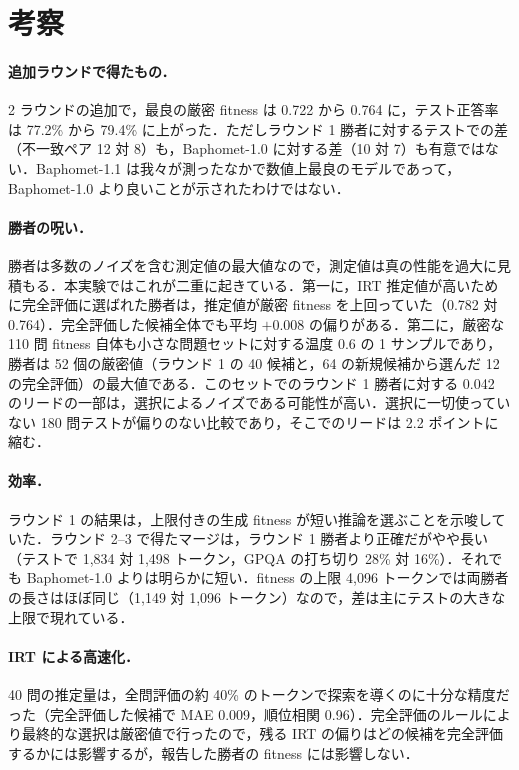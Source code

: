 \section{考察}
\paragraph{追加ラウンドで得たもの．}2 ラウンドの追加で，最良の厳密 fitness は 0.722 から 0.764 に，テスト正答率は 77.2\% から 79.4\% に上がった．ただしラウンド 1 勝者に対するテストでの差（不一致ペア 12 対 8）も，Baphomet-1.0 に対する差（10 対 7）も有意ではない．Baphomet-1.1 は我々が測ったなかで数値上最良のモデルであって，Baphomet-1.0 より良いことが示されたわけではない．

\paragraph{勝者の呪い．}勝者は多数のノイズを含む測定値の最大値なので，測定値は真の性能を過大に見積もる．本実験ではこれが二重に起きている．第一に，IRT 推定値が高いために完全評価に選ばれた勝者は，推定値が厳密 fitness を上回っていた（0.782 対 0.764）．完全評価した候補全体でも平均 $+0.008$ の偏りがある．第二に，厳密な 110 問 fitness 自体も小さな問題セットに対する温度 0.6 の 1 サンプルであり，勝者は 52 個の厳密値（ラウンド 1 の 40 候補と，64 の新規候補から選んだ 12 の完全評価）の最大値である．このセットでのラウンド 1 勝者に対する 0.042 のリードの一部は，選択によるノイズである可能性が高い．選択に一切使っていない 180 問テストが偏りのない比較であり，そこでのリードは 2.2 ポイントに縮む．

\paragraph{効率．}ラウンド 1 の結果は，上限付きの生成 fitness が短い推論を選ぶことを示唆していた．ラウンド 2--3 で得たマージは，ラウンド 1 勝者より正確だがやや長い（テストで 1,834 対 1,498 トークン，GPQA の打ち切り 28\% 対 16\%）．それでも Baphomet-1.0 よりは明らかに短い．fitness の上限 4,096 トークンでは両勝者の長さはほぼ同じ（1,149 対 1,096 トークン）なので，差は主にテストの大きな上限で現れている．

\paragraph{IRT による高速化．}40 問の推定量は，全問評価の約 40\% のトークンで探索を導くのに十分な精度だった（完全評価した候補で MAE 0.009，順位相関 0.96）．完全評価のルールにより最終的な選択は厳密値で行ったので，残る IRT の偏りはどの候補を完全評価するかには影響するが，報告した勝者の fitness には影響しない．

